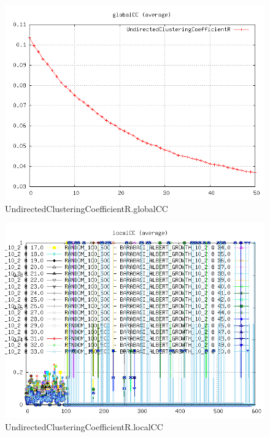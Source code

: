 \begin{figure} [h]
	\centering
	\includegraphics [scale=0.8] {plots/UndirectedClusteringCoefficientR.globalCC}
	\caption{UndirectedClusteringCoefficientR.globalCC}
	\label{plot:RANDOM_100_500 - BARABASI_ALBERT_GROWTH_10_2.UndirectedClusteringCoefficientR.globalCC}
\end{figure}

\begin{figure} [h]
	\centering
	\includegraphics [scale=0.8] {plots/UndirectedClusteringCoefficientR.localCC}
	\caption{UndirectedClusteringCoefficientR.localCC}
	\label{plot:RANDOM_100_500 - BARABASI_ALBERT_GROWTH_10_2.UndirectedClusteringCoefficientR.localCC}
\end{figure}

